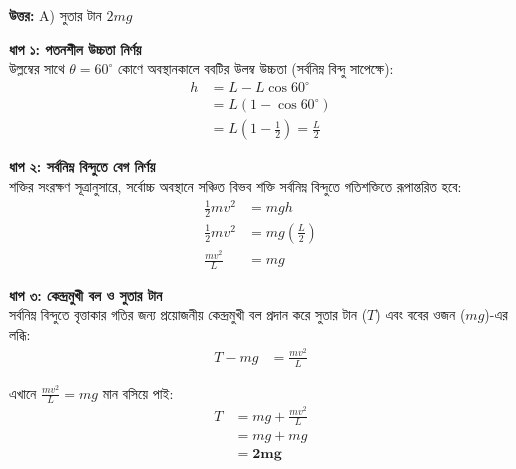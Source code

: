 \documentclass[12pt, a4paper]{article}
\begin{document}
\vspace{0.5em}
\begin{tcolorbox}[answerbox]
    \textbf{\color{success} উত্তর:} A) সুতার টান $2mg$
\end{tcolorbox}
\vspace{1em}

\begin{tcolorbox}[solutionbox={সমাধান (Solution)}]
    \noindent
    \textbf{ধাপ ১: পতনশীল উচ্চতা নির্ণয়} \\
    উল্লম্বের সাথে $\theta = 60^\circ$ কোণে অবস্থানকালে ববটির উলম্ব উচ্চতা (সর্বনিম্ন বিন্দু সাপেক্ষে):
    \begin{align*}
        h &= L - L \cos 60^\circ \\
          &= L(1 - \cos 60^\circ) \\
          &= L\left(1 - \frac{1}{2}\right) = \frac{L}{2}
    \end{align*}
    
    \vspace{0.5em}
    \noindent\textbf{ধাপ ২: সর্বনিম্ন বিন্দুতে বেগ নির্ণয়} \\
    শক্তির সংরক্ষণ সূত্রানুসারে, সর্বোচ্চ অবস্থানে সঞ্চিত বিভব শক্তি সর্বনিম্ন বিন্দুতে গতিশক্তিতে রূপান্তরিত হবে:
    \begin{align*}
        \frac{1}{2} m v^2 &= mgh \\
        \frac{1}{2} m v^2 &= mg\left(\frac{L}{2}\right) \\
        \frac{m v^2}{L} &= mg
    \end{align*}
    
    \vspace{0.5em}
    \noindent\textbf{ধাপ ৩: কেন্দ্রমুখী বল ও সুতার টান} \\
    সর্বনিম্ন বিন্দুতে বৃত্তাকার গতির জন্য প্রয়োজনীয় কেন্দ্রমুখী বল প্রদান করে সুতার টান ($T$) এবং ববের ওজন ($mg$)-এর লব্ধি:
    \begin{align*}
        T - mg &= \frac{m v^2}{L}
    \end{align*}
    
    এখানে $\frac{m v^2}{L} = mg$ মান বসিয়ে পাই:
    \begin{align*}
        T &= mg + \frac{m v^2}{L} \\
          &= mg + mg \\
          &= \mathbf{2mg}
    \end{align*}
\end{tcolorbox}
\end{document}
